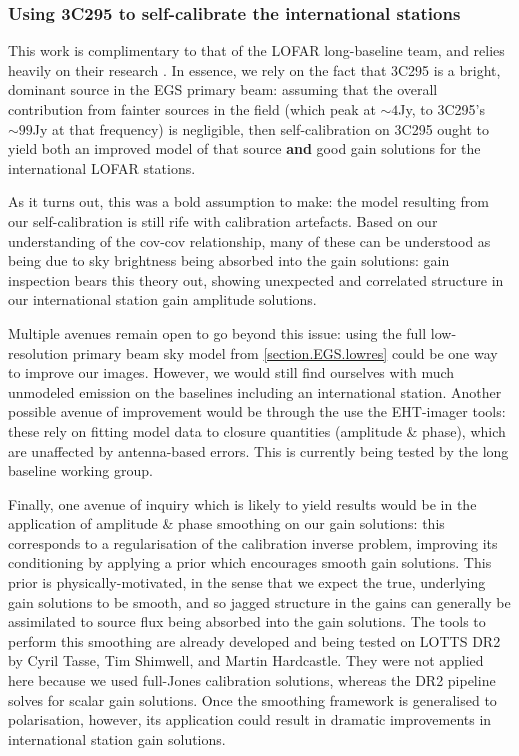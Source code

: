 \subsubsection{Using 3C295 to self-calibrate the international stations}

\pg
This work is complimentary to that of the LOFAR long-baseline team, and relies heavily on their research . In essence, we rely on the fact that 3C295 is a bright, dominant source in the EGS primary beam: assuming that the overall contribution from fainter sources in the field (which peak at $\sim4$Jy, to 3C295's $\sim99$Jy at that frequency) is negligible, then self-calibration on 3C295 ought to yield both an improved model of that source \textbf{and} good gain solutions for the international LOFAR stations.

\pg
As it turns out, this was a bold assumption to make: the model resulting from our self-calibration is still rife with calibration artefacts. Based on our understanding of the cov-cov relationship, many of these can be understood as being due to sky brightness being absorbed into the gain solutions: gain inspection bears this theory out, showing unexpected and correlated structure in our international station gain amplitude solutions. 

\pg
Multiple avenues remain open to go beyond this issue: using the full low-resolution primary beam sky model from \cref{section.EGS.lowres} could be one way to improve our images. However, we would still find ourselves with much unmodeled emission on the baselines including an international station. Another possible avenue of improvement would be through the use the EHT-imager tools: these rely on fitting model data to closure quantities (amplitude \& phase), which are unaffected by antenna-based errors. This is currently being tested by the long baseline working group.

\pg
Finally, one avenue of inquiry which is likely to yield results would be in the application of amplitude \& phase smoothing on our gain solutions: this corresponds to a regularisation of the calibration inverse problem, improving its conditioning by applying a prior which encourages smooth gain solutions. This prior is physically-motivated, in the sense that we expect the true, underlying gain solutions to be smooth, and so jagged structure in the gains can generally be assimilated to source flux being absorbed into the gain solutions. The tools to perform this smoothing are already developed and being tested on LOTTS DR2 by Cyril Tasse, Tim Shimwell, and Martin Hardcastle. They were not applied here because we used full-Jones calibration solutions, whereas the DR2 pipeline solves for scalar gain solutions. Once the smoothing framework is generalised to polarisation, however, its application could result in dramatic improvements in international station gain solutions.

